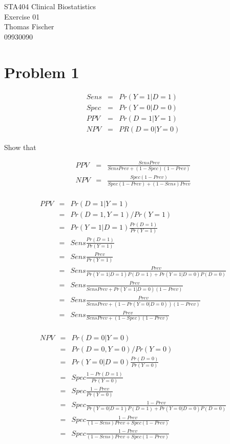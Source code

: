 \documentclass{article}\usepackage[]{graphicx}\usepackage[]{color}
\begin{document}
\begin{center}
\huge{STA404 Clinical Biostatistics}\\
\large{Exercise 01}
\vspace{1cm}\\
\large{Thomas Fischer}\\
\large{09930090}\\
\end{center}

\vspace{2.5cm}

\section{Problem 1}
\begin{eqnarray*}
Sens & = & Pr(Y = 1|D = 1)\\
Spec & = & Pr(Y = 0|D = 0)\\
PPV & = & Pr(D = 1|Y = 1)\\
NPV & = & PR(D = 0|Y = 0)
\end{eqnarray*}


Show that

\begin{eqnarray*}
PPV &=& \frac{Sens Prev}{Sens Prev + (1 - Spec) (1 - Prev)}\\
NPV &=& \frac{Spec (1 - Prev)}{Spec (1-Prev) + (1 - Sens) Prev}\\
\end{eqnarray*}

\begin{eqnarray*}
PPV &=& Pr(D = 1|Y = 1)\\
&=& Pr(D = 1, Y = 1) / Pr(Y = 1)\\
&=& Pr(Y = 1|D = 1) \frac{Pr(D = 1)}{Pr(Y = 1)}\\
&=& Sens \frac{Pr(D = 1)}{Pr(Y = 1)}\\
&=& Sens \frac{Prev}{Pr(Y = 1)}\\
&=& Sens \frac{Prev}{Pr(Y = 1|D = 1) P(D = 1) + Pr(Y = 1|D = 0) P(D = 0)}\\
&=& Sens \frac{Prev}{Sens Prev + Pr(Y = 1|D = 0) (1 - Prev)}\\
&=& Sens \frac{Prev}{Sens Prev + (1 - Pr(Y = 0|D = 0)) (1 - Prev)}\\
&=& Sens \frac{Prev}{Sens Prev + (1 - Spec) (1 - Prev)}\\
\end{eqnarray*}

\begin{eqnarray*}
NPV &=& Pr(D = 0|Y = 0)\\
&=& Pr(D = 0, Y = 0) / Pr(Y = 0)\\
&=& Pr(Y = 0|D = 0) \frac{Pr(D = 0)}{Pr(Y = 0)}\\
&=& Spec \frac{1 - Pr(D = 1)}{Pr(Y = 0)}\\
&=& Spec \frac{1 - Prev}{Pr(Y = 0)}\\
&=& Spec \frac{1-Prev}{Pr(Y = 0|D = 1) P(D = 1) + Pr(Y = 0|D = 0) P(D = 0)}\\
&=& Spec \frac{1-Prev}{(1-Sens) Prev + Spec (1 - Prev)}\\
&=& Spec \frac{1-Prev}{(1-Sens) Prev + Spec (1 - Prev)}\\
\end{eqnarray*}
\end{document}
